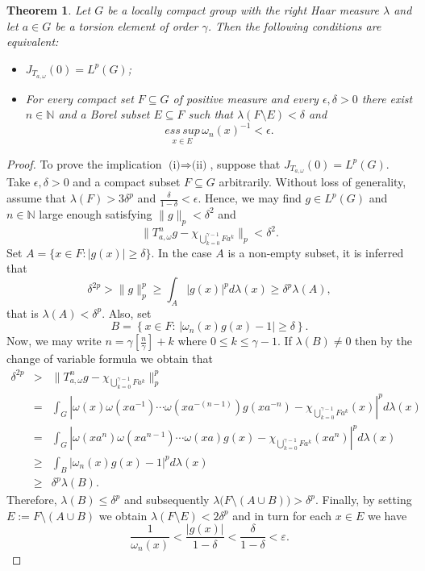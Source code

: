 \documentclass{amsart}
\newtheorem{thm}{Theorem}[section]
\theoremstyle{definition}\newtheorem{defn}[thm]{Definition}
\theoremstyle{remark}
\numberwithin{equation}{section}
\begin{document}
\begin{thm}
Let $G$ be a locally compact group with the  right Haar measure
$\lambda$ and let $a\in G$ be a torsion element of order $\gamma$.
Then the following conditions are equivalent:
\begin{itemize}
\item[(i)] $J_{T_{a,\omega}}(0)=L^p(G)$;\\
\item[(ii)] For every compact set $F\subseteq G$ of positive measure and
every $\epsilon, \delta>0$ there exist $n\in\mathbb{N}$ and a Borel
subset $E\subseteq F$ such that $\lambda(F\setminus E)<\delta$ and
$$
\underset{x\in E}{ess\,sup}\, \omega_n(x)^{-1}<\epsilon.
$$
\end{itemize}
\end{thm}
\begin{proof}
To prove the implication $\mbox{(i)}\Rightarrow\mbox{(ii)}$, suppose
that  $J_{T_{a,\omega}}(0)=L^p(G)$. Take $\epsilon, \delta>0$ and a
compact subset $F\subseteq G$ arbitrarily. Without loss of
generality, assume that $\lambda(F)>3\delta^{p}$ and
$\frac{\delta}{1-\delta}<\epsilon$. Hence, we may find $g\in L^p(G)$
and $n\in\mathbb{N}$ large enough satisfying $\|g\|_p<\delta^2$ and
$$
\|T^n_{a,\omega}g-\chi_{\bigcup_{k=0}^{\gamma-1}Fa^k}\|_p<\delta^2.
$$
Set $A=\{x\in F: |g(x)|\geq\delta\}$. In the case $A$ is a non-empty
subset, it is inferred that
$$
\delta^{2p}>\|g\|_{p}^p\geq\int_A |g(x)|^p
d\lambda(x)\geq\delta^p\lambda(A),
$$
that is $\lambda(A)<\delta^p$. Also, set
$$
B=\left\{x\in F:\,\left|\omega_n(x)g(x)-1\right|\geq\delta\right\}.
$$
Now, we may write $n=\gamma[\frac{n}{\gamma}]+k$ where $0\leq
k\leq\gamma-1$. If $\lambda(B)\neq 0$ then by the  change of
variable formula  we obtain that
\begin{eqnarray*}
\delta^{2p} &>&
\|T^{n}_{a,\omega}g-\chi_{\bigcup_{k=0}^{\gamma-1}Fa^k}\|_{p}^p\\
&=& \int_G |\omega(x)\omega(xa^{-1})\cdots
\omega(xa^{-(n-1)})g(xa^{-n})-\chi_{\bigcup_{k=0}^{\gamma-1}Fa^k}(x)|^p d\lambda(x)\\
&=& \int_G |\omega(xa^{n})\omega(xa^{n-1})\cdots
\omega(x a)g(x)-\chi_{\bigcup_{k=0}^{\gamma-1}Fa^k}(xa^n)|^p d\lambda(x)\\
&\geq&
\int_B |\omega_n(x)g(x)-1|^p d\lambda(x)\\
&\geq& \delta^p\lambda(B).
\end{eqnarray*}
Therefore, $\lambda(B)\leq\delta^p$ and subsequently
$\lambda\big(F\setminus(A\cup B)\big)>\delta^p$. Finally, by setting
$E:=F\setminus(A\cup B)$ we obtain $\lambda(F\setminus E)<2\delta^p$
and in turn for each $x\in E$ we have
$$
\frac{1}{\omega_n(x)}<\frac{|g(x)|}
{1-\delta}<\frac{\delta}{1-\delta}<\varepsilon.
$$



\end{proof}
\end{document}
